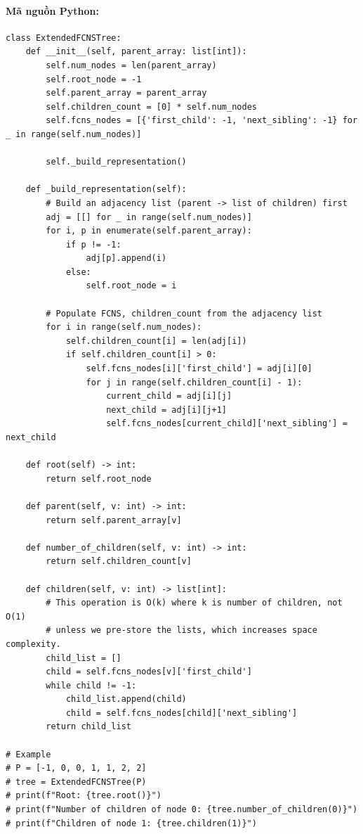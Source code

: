 \documentclass[a4paper,12pt]{article}
\begin{document}
\paragraph{Mã nguồn Python:}
\begin{lstlisting}[style=pythonstyle, caption={Lớp cây FCNS mở rộng.}]
class ExtendedFCNSTree:
    def __init__(self, parent_array: list[int]):
        self.num_nodes = len(parent_array)
        self.root_node = -1
        self.parent_array = parent_array
        self.children_count = [0] * self.num_nodes
        self.fcns_nodes = [{'first_child': -1, 'next_sibling': -1} for _ in range(self.num_nodes)]
        
        self._build_representation()

    def _build_representation(self):
        # Build an adjacency list (parent -> list of children) first
        adj = [[] for _ in range(self.num_nodes)]
        for i, p in enumerate(self.parent_array):
            if p != -1:
                adj[p].append(i)
            else:
                self.root_node = i
        
        # Populate FCNS, children_count from the adjacency list
        for i in range(self.num_nodes):
            self.children_count[i] = len(adj[i])
            if self.children_count[i] > 0:
                self.fcns_nodes[i]['first_child'] = adj[i][0]
                for j in range(self.children_count[i] - 1):
                    current_child = adj[i][j]
                    next_child = adj[i][j+1]
                    self.fcns_nodes[current_child]['next_sibling'] = next_child

    def root(self) -> int:
        return self.root_node
        
    def parent(self, v: int) -> int:
        return self.parent_array[v]

    def number_of_children(self, v: int) -> int:
        return self.children_count[v]

    def children(self, v: int) -> list[int]:
        # This operation is O(k) where k is number of children, not O(1)
        # unless we pre-store the lists, which increases space complexity.
        child_list = []
        child = self.fcns_nodes[v]['first_child']
        while child != -1:
            child_list.append(child)
            child = self.fcns_nodes[child]['next_sibling']
        return child_list

# Example
# P = [-1, 0, 0, 1, 1, 2, 2]
# tree = ExtendedFCNSTree(P)
# print(f"Root: {tree.root()}")
# print(f"Number of children of node 0: {tree.number_of_children(0)}")
# print(f"Children of node 1: {tree.children(1)}")
\end{lstlisting}
\end{document}
